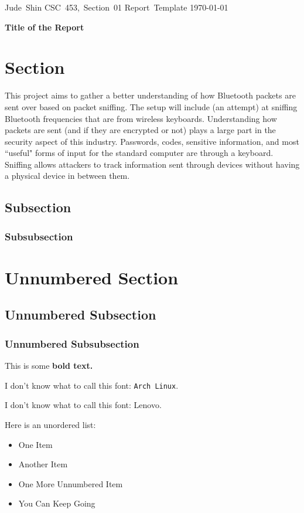 \documentclass[11pt]{article}
\begin{document}
\hfill\vbox{\hbox{Jude Shin}
		\hbox{CSC 453, Section 01}	
		\hbox{Report Template}	
		\hbox{\today}}\par

\bigskip
\centerline{\Large\bf Title of the Report}\par
\bigskip

\section{Section}

This project aims to gather a better understanding of how Bluetooth packets are sent over based on packet sniffing.
The setup will include (an attempt) at sniffing Bluetooth frequencies that are from wireless keyboards. 
Understanding how packets are sent (and if they are encrypted or not) plays a large part in the security aspect of this industry.
Passwords, codes, sensitive information, and most ``useful" forms of input for the standard computer are through a keyboard. 
Sniffing allows attackers to track information sent through devices without having a physical device in between them.

\subsection{Subsection}
\subsubsection{Subsubsection}

\section*{Unnumbered Section}
\subsection*{Unnumbered Subsection}
\subsubsection*{Unnumbered Subsubsection}

This is some \textbf{bold text.}

I don't know what to call this font: {\tt Arch Linux}.

I don't know what to call this font: {\sc Lenovo}.

Here is an unordered list:
\begin{itemize}
	\item One Item
	\item Another Item
	\item One More Unnumbered Item
	\item You Can Keep Going
\end{itemize}
\end{document}
